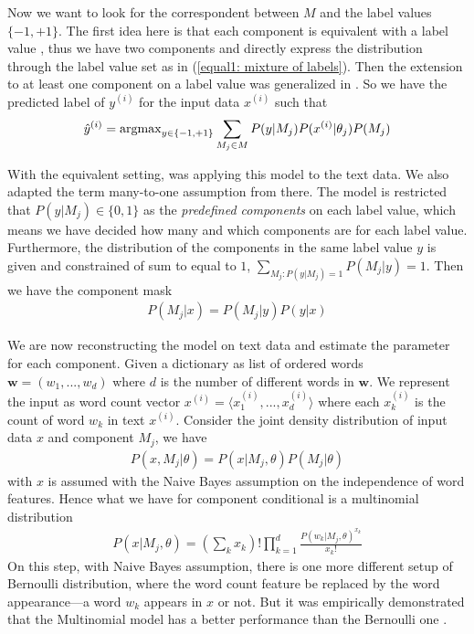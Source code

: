 Now we want to look for the correspondent between $M$ and the label values $\{-1, +1\}$. The first idea here is that each component is equivalent with a label value \parencite{10.2307/2984875}, thus we have two components and directly express the distribution through the label value set as in (\ref{equal1: mixture of labels}). Then the extension to at least one component on a label value was generalized in \parencite{NIPS1996_1208}. So we have the predicted label of $y^{(i)}$ for the input data $x^{(i)}$ such that
\begin{align}
	\hat{y}^{(i)} = \operatorname{argmax}_{y \in \{-1, +1\}}{
		\sum_{M_j \in M}{P(y | M_j) P(x^{(i)} | \theta_j) P(M_j)}
	}
\end{align}

With the equivalent setting, \citeauthor{Nigam:2000:TCL:347709.347724} \parencite{Nigam:2000:TCL:347709.347724} was applying this model to the text data. We also adapted the term many-to-one assumption from there. The model is restricted that $P(y|M_j) \in \{0,1\}$ as the \textit{predefined components} on each label value, which means we have decided how many and which components are for each label value. Furthermore, the distribution of the components in the same label value $y$ is given and constrained of sum to equal to $1$, $\sum_{M_j : P(y | M_j)=1}{ P(M_j | y) } = 1$. Then we have the component mask
\begin{align}
	P(M_j|x) = P(M_j|y) P(y|x)
\end{align}

We are now reconstructing the model on text data and estimate the parameter for each component. Given a dictionary as list of ordered words $\textbf{w} = (w_1, ..., w_d)$ where $d$ is the number of different words in $\textbf{w}$. We represent the input as word count vector $x^{(i)} = \langle x_1^{(i)}, ...,x_d^{(i)} \rangle$ where each $x_k^{(i)}$ is the count of word $w_k$ in text $x^{(i)}$. Consider the joint density distribution of input data $x$ and component $M_j$, we have
\begin{align}
	P(x, M_j | \theta) = P(x | M_j, \theta) P(M_j|\theta)
\end{align}
with $x$ is assumed with the Naive Bayes assumption on the independence of word features. Hence what we have for component conditional is a multinomial distribution
\begin{align}
	P(x | M_j, \theta) = 
	(\sum_k{ x_k })! 
	\prod_{k=1}^{d}{ 
		\frac{
			P(w_k | M_j, \theta)^{x_k}
		}{
			x_k!
		}
	}
\end{align} 
On this step, with Naive Bayes assumption, there is one more different setup of Bernoulli distribution, where the word count feature be replaced by the word appearance---a word $w_k$ appears in $x$ or not. But it was empirically demonstrated that the Multinomial model has a better performance than the Bernoulli one \parencite{mccallum1998naive}.

